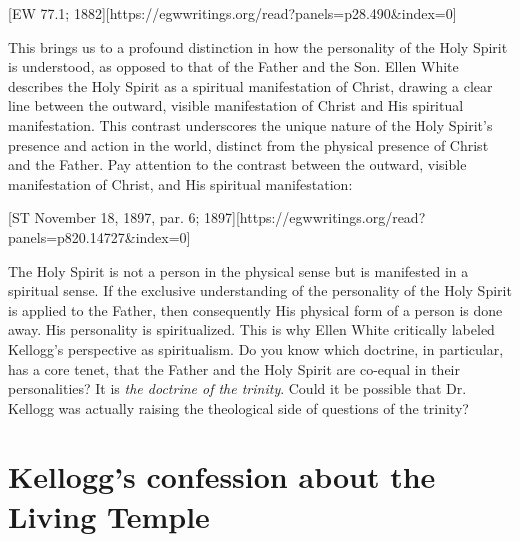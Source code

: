 [EW 77.1; 1882][https://egwwritings.org/read?panels=p28.490&index=0]

This brings us to a profound distinction in how the personality of the Holy Spirit is understood, as opposed to that of the Father and the Son. Ellen White describes the Holy Spirit as a spiritual manifestation of Christ, drawing a clear line between the outward, visible manifestation of Christ and His spiritual manifestation. This contrast underscores the unique nature of the Holy Spirit's presence and action in the world, distinct from the physical presence of Christ and the Father. Pay attention to the contrast between the outward, visible manifestation of Christ, and His spiritual manifestation:

[ST November 18, 1897, par. 6; 1897][https://egwwritings.org/read?panels=p820.14727&index=0]

The Holy Spirit is not a person in the physical sense but is manifested in a spiritual sense. If the exclusive understanding of the personality of the Holy Spirit is applied to the Father, then consequently His physical form of a person is done away. His personality is spiritualized. This is why Ellen White critically labeled Kellogg's perspective as spiritualism. Do you know which doctrine, in particular, has a core tenet, that the Father and the Holy Spirit are co-equal in their personalities? It is \textit{the doctrine of the trinity}. Could it be possible that Dr. Kellogg was actually raising the theological side of questions of the trinity?

\section*{Kellogg’s confession about the Living Temple}

